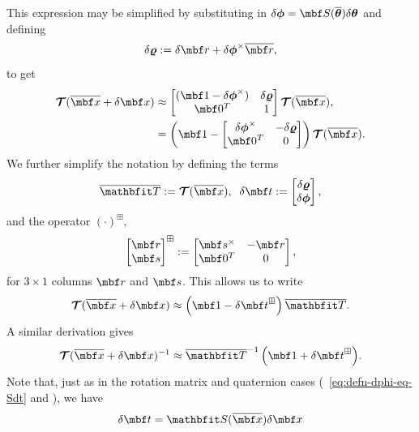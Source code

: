 \documentclass[11pt,a4,oneside]{article}
\begin{document}
This expression may be simplified by substituting in $\mbsdel \phi = \mbf S(\mbsbar \theta) \mbsdel \theta$ and defining 
\begin{equation}
  \label{eq:rho2p}
  \mbsdel \varrho := \mbfdel r + \mbsdel \phi^\times \mbfbar r,
\end{equation}
to get
\begin{subequations}
\begin{flalign}
  \mbc T(\mbfbar x + \mbfdel x) &\approx 
    \bbm
      (\mbf 1 - \mbsdel \phi^\times) &  \mbsdel \varrho \\
          \mbf 0^T                  & 1 
    \ebm
    \mbc T(\mbfbar x), \label{eq:small-tx}\\
&= 
      \left (
        \mbf 1 - 
        \bbm
          \mbsdel \phi^\times &  -\mbsdel \varrho \\
          \mbf 0^T            & 0 
        \ebm
      \right)
      \mbc T(\mbfbar x).
\end{flalign}
\end{subequations}
We further simplify the notation by defining the terms
\begin{equation}
  \mbfhbar T := \mbc T(\mbfbar x),\;\;\mbfdel t := \bbm \mbsdel \varrho \\ \mbsdel \phi \ebm,
\end{equation}
and the operator $(\cdot)^\boxplus$,
\begin{equation}
	\bbm
          \mbf r\\
          \mbf s
        \ebm^\boxplus
        := 
        \bbm 
          \mbf s^\times & -\mbf r\\
          \mbf 0^T     &     0
        \ebm,
\end{equation}
for $3 \times 1$ columns $\mbf r$ and $\mbf s$. This allows us to write
\begin{equation}
  \label{eq:lin-txmatrix}
  \mbc T(\mbfbar x + \mbfdel x) \approx 
     \left (\mbf 1 - \mbfdel t^\boxplus \right)
   \mbfhbar T.
\end{equation}
A similar derivation gives
\begin{equation}
  \label{eq:lin-txinvmatrix}
  {\mbc T(\mbfbar x + \mbfdel x)^{-1}} \approx 
  {\mbfhbar T^{-1} \left(\mbf 1 + \mbfdel t^\boxplus \right)}
.
\end{equation}
Note that, just as in the rotation matrix and quaternion cases (~\eqref{eq:defn-dphi-eq-Sdt} and ), we have
\begin{equation}
  \label{eq:def-T-S}
  \mbfdel t = \mbfh S(\mbfbar x) \mbfdel x
\end{equation}
\end{document}
